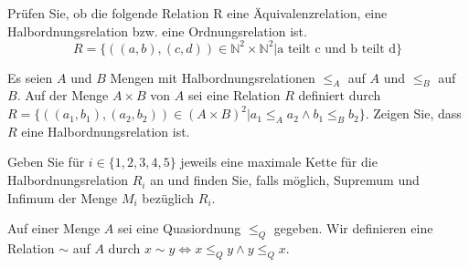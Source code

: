 \documentclass[10pt, a4paper]{exam}
\begin{document}
\begin{questions}
    \question Prüfen Sie, ob die folgende Relation R eine Äquivalenzrelation, eine Halbordnungsrelation bzw. eine Ordnungsrelation ist. $$R=\{((a, b), (c, d))\in \mathbb{N}^2\times\mathbb{N}^2 | \text{a teilt c und b teilt d}\}$$

    \question Es seien $A$ und $B$ Mengen mit Halbordnungsrelationen $\leq_A$ auf $A$ und $\leq_B$ auf $B$. Auf der Menge $A\times B$ von $A$ sei eine Relation $R$ definiert durch $R=\{((a_1, b_1), (a_2, b_2))\in (A\times B)^2 | a_1\leq_A a_2 \wedge b_1 \leq_B b_2\}$. Zeigen Sie, dass $R$ eine Halbordnungsrelation ist.

    \question Geben Sie für $i\in\{1, 2, 3, 4, 5\}$ jeweils eine maximale Kette für die Halbordnungsrelation $R_i$ an und finden Sie, falls möglich, Supremum und Infimum der Menge $M_i$ bezüglich $R_i$.

    \question Auf einer Menge $A$ sei eine Quasiordnung $\leq_Q$ gegeben. Wir definieren eine Relation $\sim$ auf $A$ durch $x\sim y\Leftrightarrow x \leq_Q y \wedge y \leq_Q x$.
    \begin{parts}

\end{parts}
\end{questions}
\end{document}
